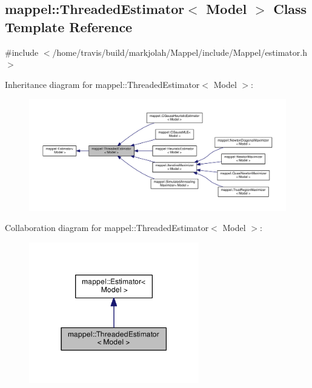 \hypertarget{classmappel_1_1ThreadedEstimator}{}\subsection{mappel\+:\+:Threaded\+Estimator$<$ Model $>$ Class Template Reference}
\label{classmappel_1_1ThreadedEstimator}


{\ttfamily \#include $<$/home/travis/build/markjolah/\+Mappel/include/\+Mappel/estimator.\+h$>$}



Inheritance diagram for mappel\+:\+:Threaded\+Estimator$<$ Model $>$\+:\nopagebreak
\begin{figure}[H]
\begin{center}
\leavevmode
\includegraphics[width=350pt]{classmappel_1_1ThreadedEstimator__inherit__graph}
\end{center}
\end{figure}


Collaboration diagram for mappel\+:\+:Threaded\+Estimator$<$ Model $>$\+:\nopagebreak
\begin{figure}[H]
\begin{center}
\leavevmode
\includegraphics[width=210pt]{classmappel_1_1ThreadedEstimator__coll__graph}
\end{center}
\end{figure}
